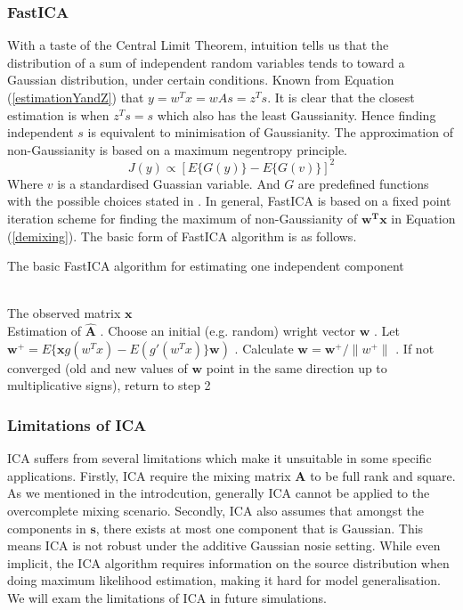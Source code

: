 \subsubsection{FastICA}
With a taste of the Central Limit Theorem, intuition tells us that the distribution of a sum of independent random variables tends to toward a Gaussian distribution, under certain conditions. Known from Equation (\ref{estimationYandZ}) that $y = w^T x = w A s = z^T s$. It is clear that the closest estimation is when $z^Ts = s$ which also has the least Gaussianity. Hence finding independent $s$ is equivalent to minimisation of Gaussianity. The approximation of non-Gaussianity is based on a maximum negentropy principle.
\begin{equation}
    J(y) \propto [E\{G(y)\} - E\{G(v)\}]^2
\end{equation}
Where $v$ is a standardised Guassian variable. And $G$ are predefined functions with the possible choices stated in \cite{HYVARINEN2000411}. In general, FastICA is based on a fixed point iteration scheme for finding the maximum of non-Gaussianity of $\mathbf{w^T x}$ in Equation (\ref{demixing}). The basic form of FastICA algorithm is as follows.
\begin{algorithm}[H] 
\caption{ The basic FastICA algorithm for estimating one independent component}
\label{alg:Framwork} 
\begin{algorithmic}
\REQUIRE ~~\\%
The observed matrix $\mathbf{x}$
\ENSURE ~~\\ %
Estimation of $\hat{\mathbf{A}}$
. Choose an initial (e.g. random) wright vector $\mathbf{w}$
. Let $\mathbf{w}^+ = E\{\mathbf{x}g(w^T x) - E(g'(w^Tx)\}\mathbf{w})$
. Calculate $\mathbf{w} = \mathbf{w}^{+}/\lVert w^{+}\rVert$
. If not converged (old and new values of $\mathbf{w}$ point in the same direction up to multiplicative signs), return to step 2
\end{algorithmic}
\end{algorithm}
\subsubsection{Limitations of ICA}
ICA suffers from several limitations which make it unsuitable in some specific applications. Firstly, ICA require the mixing matrix $\mathbf{A}$ to be full rank and square. As we mentioned in the introdcution, generally ICA cannot be applied to the overcomplete mixing scenario. Secondly, ICA also assumes that amongst the components in $\mathbf{s}$, there exists at most one component that is Gaussian. This means ICA is not robust under the additive Gaussian nosie setting. While even implicit, the ICA algorithm requires information on the source distribution when doing maximum likelihood estimation, making it hard for model generalisation. We will exam the limitations of ICA in future simulations.

